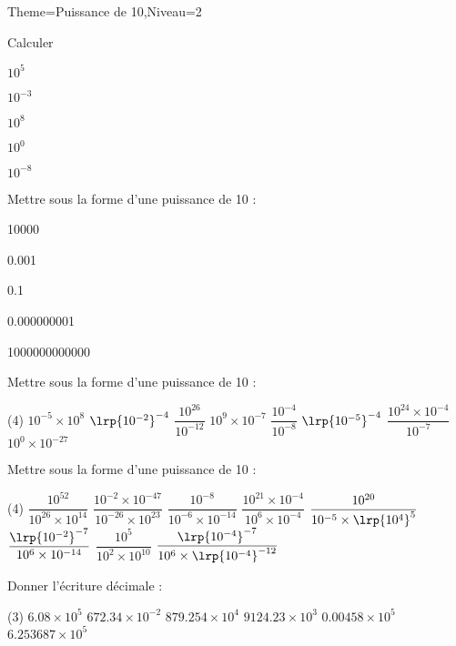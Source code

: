 \documentclass[a4paper,12pt]{article}
\begin{document}
\begin{Maquette}[Fiche]{Theme=Puissance de 10,Niveau=2}

\begin{exercice}
Calculer 
\begin{itemize*}
\item $10^{5}$
\item $10^{-3}$
\item $10^{8}$
\item $10^{0}$
\item $10^{-8}$
\end{itemize*}
\end{exercice}
\begin{exercice}
Mettre sous la forme d'une puissance de 10 :
\begin{itemize*}
\item 10000
\item 0.001
\item 0.1
\item 0.000000001
\item 1000000000000 
\end{itemize*}
\end{exercice}
\begin{exercice}
Mettre sous la forme d'une puissance de 10 :
\begin{tasks}(4)
\task $10^{-5}\times 10^{8}$
\task  $\lrp{10^{-2}}^{-4}$
\task $\dfrac{ 10^{26}}{ 10^{-12}}$
\task $ 10^{9}\times 10^{-7}$
\task $\dfrac{ 10^{-4}}{ 10^{-8}}$
\task $\lrp{ 10^{-5}}^{-4}$
\task $\dfrac{ 10^{24}\times  10^{-4}}{ 10^{-7}}$
\task $ 10^{0}\times  10^{-27}$
\end{tasks}
\end{exercice}

\begin{exercice}
Mettre sous la forme d'une puissance de 10 :
\begin{tasks}(4)
\task $\dfrac{10^{52}}{10^{26}\times 10^{14}}$
\task $\dfrac{10^{-2}\times 10^{-47}}{10^{-26}\times 10^{23}}$
\task $\dfrac{10^{-8}}{10^{-6}\times 10^{-14}}$
\task $\dfrac{10^{21}\times 10^{-4}}{10^{6}\times 10^{-4}}$
\task $\dfrac{10^{20}}{10^{-5}\times \lrp{10^{4}}^{5}}$
\task $\dfrac{\lrp{10^{-2}}^{-7}}{10^{6}\times 10^{-14}}$
\task $\dfrac{10^{5}}{10^{2}\times 10^{10}}$
\task $\dfrac{\lrp{10^{-4}}^{-7}}{10^{6}\times \lrp{10^{-4}}^{-12}}$
\end{tasks}
\end{exercice}

\begin{exercice}
Donner l'écriture décimale :
\begin{tasks}(3)
\task $6.08\times 10^{5}$
\task $672.34\times 10^{-2}$
\task $879.254\times 10^{4}$
\task $9124.23\times 10^{3}$
\task $0.00458\times 10^{5}$
\task $6.253687\times 10^{5}$
\end{tasks}
\end{exercice}


\end{Maquette}
\end{document}
